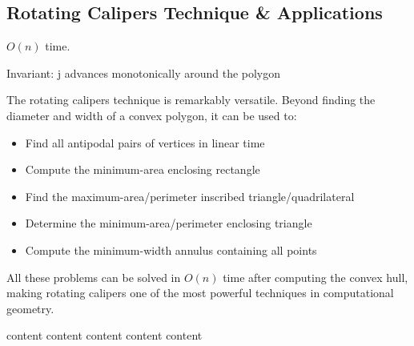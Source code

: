 \clearpage
\subsection{Rotating Calipers Technique \& Applications}
\label{ssec:rotating_calipers}



\begin{complexity}
\label{comp:rotating_calipers}
$O(n)$ time.
\end{complexity}
Invariant: j advances monotonically around the polygon

\begin{insight}
The rotating calipers technique is remarkably versatile. Beyond finding the diameter and width of a convex polygon, it can be used to:
\begin{itemize}
    \item Find all antipodal pairs of vertices in linear time
    \item Compute the minimum-area enclosing rectangle
    \item Find the maximum-area/perimeter inscribed triangle/quadrilateral
    \item Determine the minimum-area/perimeter enclosing triangle
    \item Compute the minimum-width annulus containing all points
\end{itemize}
All these problems can be solved in $O(n)$ time after computing the convex hull, making rotating calipers one of the most powerful techniques in computational geometry.
\end{insight}

{content}
{content}
{content}
{content}
{content} 